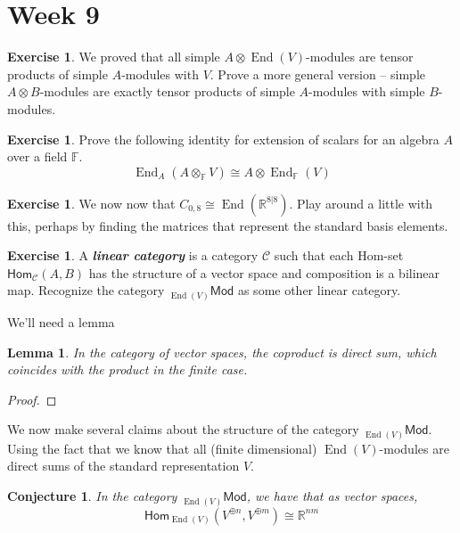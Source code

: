 \documentclass[psamsfonts]{amsart}
\newtheorem*{lem*}{Lemma}
\newtheorem{conj}[thm]{Conjecture}
\theoremstyle{definition}
\newtheorem{exer}[thm]{Exercise}
\theoremstyle{remark}
\renewcommand{\hom}{\mathsf{Hom}}
\newcommand{\R}{\mathbb{R}}
\newcommand{\ib}[1]{\textbf{\textit{#1}}}
\newcommand{\F}{\mathbb{F}}
\DeclareMathOperator{\End}{End}
\begin{document}
\section*{Week 9}
%
\begin{exer}
We proved that all simple $A \otimes \End(V)$-modules are tensor products of simple $A$-modules with $V$. Prove a more general version -- simple $A \otimes B$-modules are exactly tensor products of simple $A$-modules with simple $B$-modules.
\end{exer}
%
\begin{exer}
Prove the following identity for extension of scalars for an algebra $A$ over a field $\F$.
$$\End_A(A \otimes_\F V) \cong A \otimes \End_\F(V) $$
\end{exer}
%
\begin{exer}
We now now that $C_{0,8} \cong \End(\R^{8|8})$. Play around a little with this, perhaps by finding the matrices that represent the standard basis elements.
\end{exer}
%
\begin{exer}
A \ib{linear category} is a category $\mathscr{C}$ such that each Hom-set $\hom_{\mathscr{C}}(A,B)$ has the structure of a vector space and composition is a bilinear map. Recognize the category $ _{\End(V)}\mathsf{Mod}$ as some other linear category.
\end{exer}
We'll need a lemma 
\begin{lem*}
In the category of vector spaces, the coproduct is direct sum, which coincides with the product in the finite case.
\end{lem*}
\begin{proof}
\TODO
\end{proof}
We now make several claims about the structure of the category $ _{\End(V)}\mathsf{Mod}$. Using the fact that we know that all (finite dimensional) $\End(V)$-modules are direct sums of the standard representation $V$.
%
\begin{conj}
In the category $ _{\End(V)}\mathsf{Mod}$, we have that as vector spaces,
$$\hom_{\End(V)}(V^{\oplus n}, V^{\oplus m}) \cong \R^{nm} $$
\end{conj}
%
\end{document}
